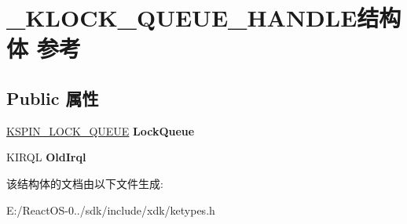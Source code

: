 \hypertarget{struct___k_l_o_c_k___q_u_e_u_e___h_a_n_d_l_e}{}\section{\+\_\+\+K\+L\+O\+C\+K\+\_\+\+Q\+U\+E\+U\+E\+\_\+\+H\+A\+N\+D\+L\+E结构体 参考}
\label{struct___k_l_o_c_k___q_u_e_u_e___h_a_n_d_l_e}
\subsection*{Public 属性}
\begin{DoxyCompactItemize}
\item 
\mbox{\label{struct___k_l_o_c_k___q_u_e_u_e___h_a_n_d_l_e_a7b9d09650c2a83ae686261aab7dad467}} 
\hyperlink{struct___k_s_p_i_n___l_o_c_k___q_u_e_u_e}{K\+S\+P\+I\+N\+\_\+\+L\+O\+C\+K\+\_\+\+Q\+U\+E\+UE} {\bfseries Lock\+Queue}
\item 
\mbox{\label{struct___k_l_o_c_k___q_u_e_u_e___h_a_n_d_l_e_af6e9160713965d82fbc24d3a6d4cf7b0}} 
K\+I\+R\+QL {\bfseries Old\+Irql}
\end{DoxyCompactItemize}


该结构体的文档由以下文件生成\+:\begin{DoxyCompactItemize}
\item 
E\+:/\+React\+O\+S-\/0../sdk/include/xdk/ketypes.\+h\end{DoxyCompactItemize}
